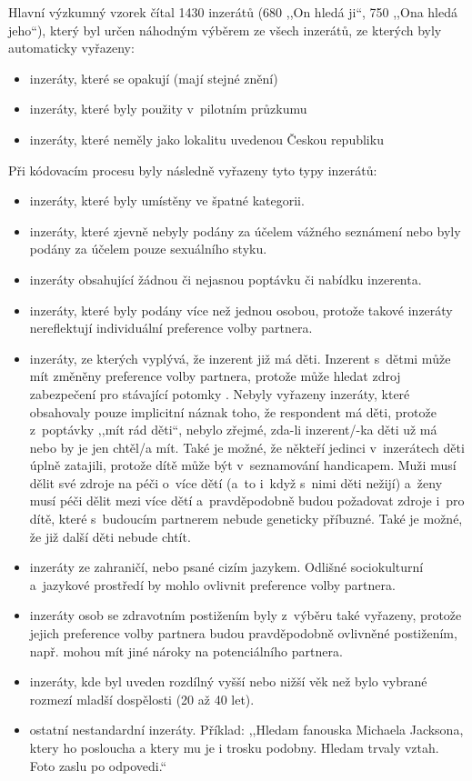 \documentclass[a4paper, 12pt, notitlepage, oneside, numbers=noenddot]{report}
\begin{document}
Hlavní výzkumný vzorek čítal 1430 inzerátů (680 ,,On hledá ji``, 750
,,Ona hledá jeho``), který byl určen náhodným výběrem ze všech
inzerátů, ze kterých byly automaticky vyřazeny:

\begin{itemize}
\item inzeráty, které se opakují (mají stejné znění)
\item inzeráty, které byly použity v~pilotním průzkumu
\item inzeráty, které neměly jako lokalitu uvedenou Českou republiku
\end{itemize}
Při kódovacím procesu byly následně vyřazeny tyto typy inzerátů:

\begin{itemize}
\item inzeráty, které byly umístěny ve špatné kategorii.
\item inzeráty, které zjevně nebyly podány za účelem vážného seznámení
  nebo byly podány za účelem pouze sexuálního styku.
\item inzeráty obsahující žádnou či nejasnou poptávku či nabídku
  inzerenta.
\item inzeráty, které byly podány více než jednou osobou, protože
  takové inzeráty nereflektují individuální preference volby partnera.
\item inzeráty, ze kterých vyplývá, že inzerent již má děti. Inzerent
  s~dětmi může mít změněny preference volby partnera, protože může
  hledat zdroj zabezpečení pro stávající potomky
  \citep{WayfordDunbar1995}.  Nebyly vyřazeny inzeráty, které
  obsahovaly pouze implicitní náznak toho, že respondent má děti,
  protože z~poptávky ,,mít rád děti``, nebylo zřejmé, zda-li
  inzerent/-ka děti už má nebo by je jen chtěl/a mít.  Také je možné,
  že někteří jedinci v~inzerátech děti úplně zatajili, protože dítě
  může být v~seznamování handicapem.  Muži musí dělit své zdroje na
  péči o~více dětí (a~to i~když s~nimi děti nežijí) a~ženy musí péči
  dělit mezi více dětí a~pravděpodobně budou požadovat zdroje i~pro
  dítě, které s~budoucím partnerem nebude geneticky příbuzné. Také je
  možné, že již další děti nebude chtít.
\item inzeráty ze zahraničí, nebo psané cizím jazykem.  Odlišné
  sociokulturní a~jazykové prostředí by mohlo ovlivnit preference
  volby partnera.
\item inzeráty osob se zdravotním postižením byly z~výběru také
  vyřazeny, protože jejich preference volby partnera budou
  pravděpodobně ovlivněné postižením, např. mohou mít jiné nároky na
  potenciálního partnera.
\item inzeráty, kde byl uveden rozdílný vyšší nebo nižší věk než bylo
  vybrané rozmezí mladší dospělosti (20 až 40 let).
\item ostatní nestandardní inzeráty.  Příklad: ,,Hledam fanouska
  Michaela Jacksona, ktery ho posloucha a ktery mu je i trosku
  podobny. Hledam trvaly vztah. Foto zaslu po odpovedi.``
\end{itemize}
\end{document}
